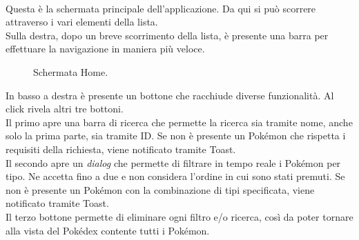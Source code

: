 \documentclass[a4paper,11pt]{article}
\begin{document}
  \paragraph{}
  Questa è la schermata principale dell’applicazione. Da qui si può scorrere attraverso i vari elementi della lista.\\
Sulla destra, dopo un breve scorrimento della lista, è presente una barra per effettuare la navigazione in maniera più veloce.\\
  \begin{figure}[h!]
    \centering
	\caption{Schermata Home.}
\end{figure}
\newpage
In basso a destra è presente un bottone che racchiude diverse funzionalità. Al click rivela altri tre bottoni.\\Il primo apre una barra di ricerca che permette la ricerca sia tramite nome, anche solo la prima parte, sia tramite ID. Se non è presente un Pokémon che rispetta i requisiti della richiesta, viene notificato tramite Toast.\\
Il secondo apre un \textit{dialog} che permette di filtrare in tempo reale i Pokémon per tipo. Ne accetta fino a due e non considera l’ordine in cui sono stati premuti. Se non è presente un Pokémon con la combinazione di tipi specificata, viene notificato tramite Toast.\\
Il terzo bottone permette di eliminare ogni filtro e/o ricerca, così da poter tornare alla vista del Pokédex contente tutti i Pokémon.\\
\end{document}
